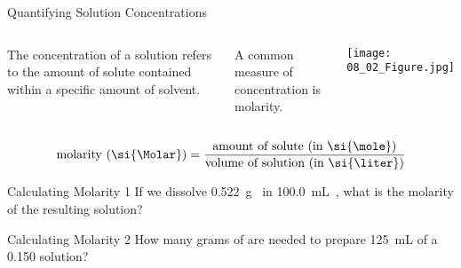 \documentclass[notes=only]{beamer}
\begin{document}
\begin{frame}{Quantifying Solution Concentrations}
	\begin{columns}
		The \alert{concentration} of a solution refers to the amount of solute
		contained within
		a specific amount of solvent.
	
		\bigskip
	
		A common measure of concentration is \alert{molarity}.
		\begin{center}
			\texttt{[image: 08\_02\_Figure.jpg]}
		\end{center}
	\end{columns}

	\bigskip

	\begin{equation*}
		\text{molarity (\si{\Molar})} = \frac{\text{amount of solute (in
		\si{\mole})}}{\text{volume of solution (in \si{\liter})}}
	\end{equation*}
\end{frame}

\begin{frame}[t]{Calculating Molarity 1}
	If we dissolve \SI{0.522}{\gram}~ in
	\SI{100.0}{\milli\liter}~, what is the molarity of the resulting
	solution?

	\vspace{10em}

\end{frame}

\begin{frame}[t]{Calculating Molarity 2}
	How many grams of  are needed to prepare
	\SI{125}{\milli\liter} of a \SI{0.150}{\Molar} solution?

	\vspace{10em}

\end{frame}
\end{document}
